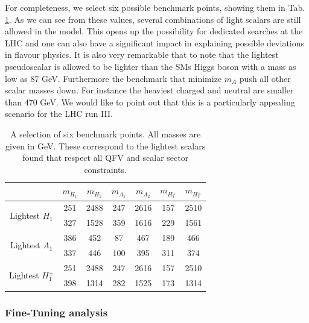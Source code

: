 \documentclass[10pt]{report}
\begin{document}
For completeness, we select six possible benchmark points, showing them in Tab.\,\ref{Tab:BadTable}.
%
As we can see from these values, several combinations of light scalars are still allowed in the model. This opens up the possibility for dedicated searches at the LHC and one can also have a significant impact in explaining possible deviations in flavour physics.
%
It is also very remarkable that to note that the lightest pseudoscalar is allowed to be lighter than the SMs Higgs boson with a mass as low as 87 GeV. Furthermore the benchmark that minimize $m_A$ push all other scalar masses down. For instance the heaviest charged and neutral are smaller than 470 GeV. We would like to point out that this is a particularly appealing scenario for the LHC run III.  

\begin{table}[!htb]
	\centering
	\begin{tabular}{c|c|c|c|c|c|c|}
		\cline{2-7} 
		& $m_{H_1}$ & $m_{H_2}$ & $m_{A_1}$ & $m_{A_2}$ & $m_{H^\pm_1}$ & $m_{H^\pm_2}$ \\ \hline
		\multicolumn{1}{|c|}{\multirow{2}{*}{Lightest $H_1$}}     & 251 & 2488 & 247 & 2616 & 157 & 2510  \\ \cline{2-7} 
		\multicolumn{1}{|c|}{}                                    & 327 & 1528 & 359 & 1616 & 229 & 1561  \\ \hline
		\multicolumn{1}{|c|}{\multirow{2}{*}{Lightest $A_1$}}     & 386 & 452  & 87  & 467 & 189  & 466  \\ \cline{2-7} 
		\multicolumn{1}{|c|}{}                                    & 337 & 446  & 100 & 395 & 311  & 374  \\ \hline
		\multicolumn{1}{|c|}{\multirow{2}{*}{Lightest $H^\pm_1$}} & 251 & 2488 & 247 & 2616 & 157 & 2510 \\ \cline{2-7} 
		\multicolumn{1}{|c|}{}                                    & 398 & 1314 & 282 & 1525 & 173 & 1314 \\ \hline
	\end{tabular}
	\caption{A selection of six benchmark points. All masses are given in GeV. These correspond to the lightest scalars found that respect all QFV and scalar sector constraints.}
	\label{Tab:BadTable}
\end{table}

\subsubsection{Fine-Tuning analysis}
\end{document}
